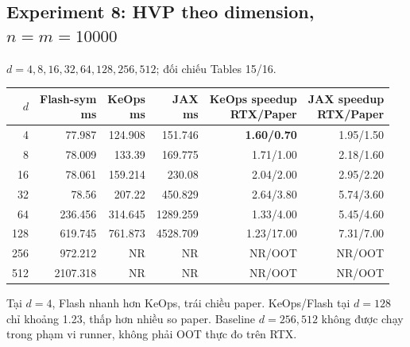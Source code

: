 \documentclass[11pt,a4paper]{article}
\newcommand{\NR}{\textnormal{NR}}
\begin{document}
\subsection{Experiment 8: HVP theo dimension, $n=m=10000$}
$d=4,8,16,32,64,128,256,512$; đối chiếu Tables 15/16.
\begin{center}\footnotesize
\setlength{\tabcolsep}{5pt}
\begin{tabular}{@{}rrrrrr@{}}
\toprule
$d$ & \shortstack{Flash-sym\\ms} & \shortstack{KeOps\\ms} & \shortstack{JAX\\ms} & \shortstack{KeOps speedup\\RTX/Paper} & \shortstack{JAX speedup\\RTX/Paper} \\
\midrule
4 & 77.987 & 124.908 & 151.746 & \textbf{1.60/0.70} & 1.95/1.50 \\
8 & 78.009 & 133.39 & 169.775 & 1.71/1.00 & 2.18/1.60 \\
16 & 78.061 & 159.214 & 230.08 & 2.04/2.00 & 2.95/2.20 \\
32 & 78.56 & 207.22 & 450.829 & 2.64/3.80 & 5.74/3.60 \\
64 & 236.456 & 314.645 & 1289.259 & 1.33/4.00 & 5.45/4.60 \\
128 & 619.745 & 761.873 & 4528.709 & 1.23/17.00 & 7.31/7.00 \\
256 & 972.212 & \NR & \NR & \NR/OOT & \NR/OOT \\
512 & 2107.318 & \NR & \NR & \NR/OOT & \NR/OOT \\
\bottomrule
\end{tabular}
\end{center}
Tại $d=4$, Flash nhanh hơn KeOps, trái chiều paper. KeOps/Flash tại $d=128$
chỉ khoảng 1.23, thấp hơn nhiều so paper. Baseline $d=256,512$ không được
chạy trong phạm vi runner, không phải OOT thực đo trên RTX.
\end{document}
